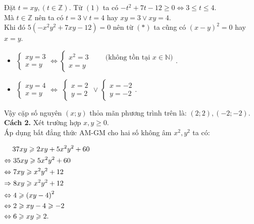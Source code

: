\begin{ex}
{\begin{enumerate}[a)]
Đặt $t=xy, (t \in \mathbb{Z})$. Từ $(1)$ ta có $-t^2+7t-12 \geq 0 \Leftrightarrow 3 \leq t \leq 4$.\\
Mà $t \in \mathbb{Z}$ nên ta có $t=3 \vee t=4$ hay $xy=3 \vee xy=4$.\\
Khi đó $5(-x^2y^2+7xy-12)=0$ nên từ $(*)$ ta cũng có $(x-y)^2=0 $ hay $x=y$.
\begin{itemize}
\item $\begin{cases}xy=3\\
x=y
\end{cases} \Leftrightarrow \begin{cases}
x^2=3\hspace{1cm} \text{(không tồn tại $x\in \mathbb{N})$}\\
x=y
\end{cases}$.
\item $\begin{cases}
xy=4\\
x=y
\end{cases} \Leftrightarrow$ $\begin{cases}
x=2\\
y=2
\end{cases}$
$\vee$
$\begin{cases}
x=-2\\
y=-2
\end{cases}$.
\end{itemize}
Vậy cặp số nguyên $(x;y)$ thỏa mãn phương trình trên là: $(2;2), (-2;-2)$.\\
\textbf{Cách 2.}
Xét trường hợp $x, y \geq 0$.\\
Áp dụng bất đẳng thức AM-GM cho hai số không âm $x^2, y^2$ ta có:
\begin{center}
$\begin{gathered}
  \,\,\,\,\,\,\,37xy \geqslant 2xy + 5{x^2}{y^2} + 60 \hfill \\
   \Leftrightarrow 35xy \geqslant 5{x^2}{y^2} + 60 \hfill \\
   \Leftrightarrow 7xy \geqslant {x^2}{y^2} + 12 \hfill \\
   \Rightarrow 8xy \geqslant {x^2}{y^2} + 12 \hfill \\
   \Leftrightarrow 4 \geqslant {\left( {xy - 4} \right)^2} \hfill \\
   \Leftrightarrow 2 \geqslant xy - 4 \geqslant  - 2 \hfill \\
   \Leftrightarrow 6 \geqslant xy \geqslant 2. \hfill \\ 
\end{gathered} $

\end{center}
\end{enumerate}}
\end{ex}
